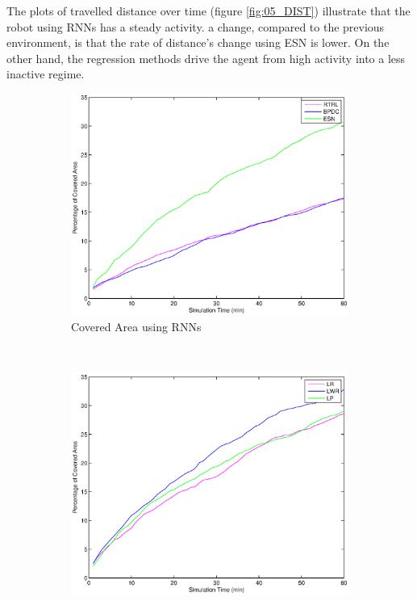 \documentclass[msc,ai,logo]{infthesis}
\begin{document}
The plots of travelled distance over time (figure \ref{fig:05_DIST}) illustrate that the robot using RNNs has a steady activity. a change, compared to the previous environment, is that the rate of distance's change using ESN is lower. On the other hand, the regression methods drive the agent from high activity into a less inactive regime.    
 
\begin{figure}[H]
        \centering
       
        \begin{subfigure}[b]{0.49\textwidth}
                \centering
                \includegraphics[width=\textwidth]{RNN_05_AREA.eps}
                \caption{Covered Area using RNNs}
              \label{fig:RNN_05_AREA}  
        \end{subfigure}%
        ~ %
        \begin{subfigure}[b]{0.49\textwidth}
                \centering
                \includegraphics[width=\textwidth]{LR_05_AREA.eps}

\end{subfigure}
\end{figure}
\end{document}
